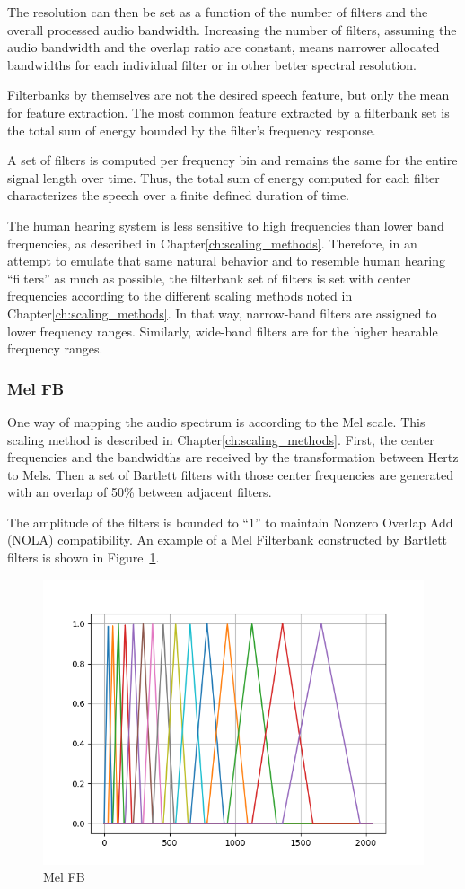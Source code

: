 The resolution can then be set as a function of
the number of filters and the overall processed audio bandwidth.
Increasing the number of filters, assuming the 
audio bandwidth and the overlap ratio are constant, means
narrower allocated bandwidths for each individual filter
or in other better spectral resolution.

Filterbanks by themselves are not the desired speech feature,
but only the mean for feature extraction. 
The most common feature extracted by a filterbank set
is the total sum of energy bounded by the filter's frequency response.

A set of filters is computed per 
frequency bin and remains the same for 
the entire signal length over time.
Thus, the total sum of energy computed for 
each filter characterizes the 
speech over a finite defined duration of time.

The human hearing system is less sensitive to high frequencies
than lower band frequencies, as described in Chapter\;\ref{ch:scaling_methods}.
Therefore, in an attempt to emulate that same natural behavior and
to resemble human hearing ``filters'' as much as possible, 
the filterbank set of filters is set with center frequencies
according to the different scaling 
methods noted in Chapter\;\ref{ch:scaling_methods}.
In that way, narrow-band filters are assigned to 
lower frequency ranges. 
Similarly, wide-band filters are for 
the higher hearable frequency ranges.

\subsubsection{Mel FB}
One way of mapping the audio spectrum is according to the Mel
scale. This scaling method is described in Chapter\;\ref{ch:scaling_methods}.
First, the center frequencies and the bandwidths are received by the transformation
between Hertz to Mels. Then a set of Bartlett
filters with those center frequencies are generated
with an overlap of 50\% between adjacent filters. 


The amplitude of the filters is bounded to ``\(1\)''
to maintain Nonzero Overlap Add (NOLA) compatibility.
An example of a Mel Filterbank constructed by Bartlett filters
is shown in Figure~\ref{fig:sb_mel_fb}.
\begin{figure}[H]
    \centering
    \includegraphics[width=0.75\linewidth]{Features/images/sb_mel_fb}
    \caption{Mel FB}\label{fig:sb_mel_fb}
\end{figure}

